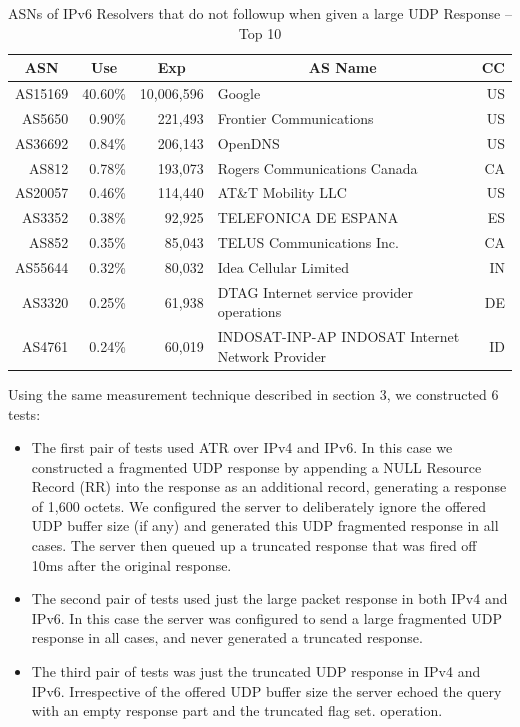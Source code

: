 \begin{table}[t]
   \caption{ASNs of IPv6 Resolvers that do not followup when given a large UDP Response – Top 10}
   \centering
\begin{tabular}{@{}rrrlr@{}}
\toprule
\multicolumn{1}{c}{\textbf{ASN}} & \multicolumn{1}{c}{\textbf{Use}} & \multicolumn{1}{c}{\textbf{Exp}} & \multicolumn{1}{c}{\textbf{AS Name}} & \multicolumn{1}{l}{\textbf{CC}} \\ \midrule
AS15169 & 40.60\% & 10,006,596 & Google & US \\
AS5650 & 0.90\% & 221,493 & Frontier Communications & US \\
AS36692 & 0.84\% & 206,143 & OpenDNS & US \\
AS812 & 0.78\% & 193,073 & Rogers Communications Canada & CA \\
AS20057 & 0.46\% & 114,440 & AT\&T Mobility LLC & US \\
AS3352 & 0.38\% & 92,925 & TELEFONICA DE ESPANA & ES \\
AS852 & 0.35\% & 85,043 & TELUS Communications Inc. & CA \\
AS55644 & 0.32\% & 80,032 & Idea Cellular Limited & IN \\
AS3320 & 0.25\% & 61,938 & DTAG Internet service provider operations & DE \\
AS4761 & 0.24\% & 60,019 & INDOSAT-INP-AP INDOSAT Internet Network Provider & ID \\ \bottomrule
\end{tabular}
\label{tab:ASN-IPv6}
\end{table}

Using the same measurement technique described in section 3, 
we constructed 6 tests:

\begin{itemize}
  \item The first pair of tests used ATR over IPv4 and IPv6. 
  In this case we constructed a fragmented UDP response by 
  appending a NULL Resource Record (RR) into the response as 
  an additional record, generating a response of 1,600 octets. 
  We configured the server to deliberately ignore the offered 
  UDP buffer size (if any) and generated this UDP fragmented 
  response in all cases. The server then queued up a truncated 
  response that was fired off 10ms after the original response.
  \item The second pair of tests used just the large packet 
  response in both IPv4 and IPv6. In this case the server was 
  configured to send a large fragmented UDP response in all 
  cases, and never generated a truncated response.
  \item The third pair of tests was just the truncated UDP 
  response in IPv4 and IPv6. Irrespective of the offered UDP 
  buffer size the server echoed the query with an empty 
  response part and the truncated flag set.
      operation.
\end{itemize}

